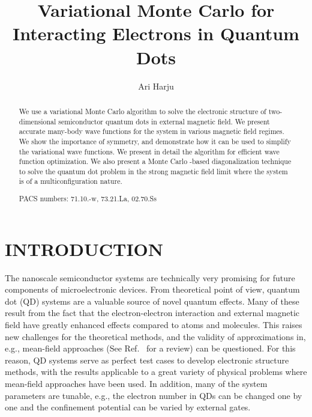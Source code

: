 \documentclass{article}
\title{Variational Monte Carlo for Interacting Electrons in Quantum Dots}
\author{Ari Harju}
\begin{document}
\maketitle

\begin{abstract}
  
  We use a variational Monte Carlo algorithm to solve the electronic
  structure of two-dimensional semiconductor quantum dots in external
  magnetic field. We present accurate many-body wave functions for the
  system in various magnetic field regimes. We show the importance of
  symmetry, and demonstrate how it can be used to simplify the
  variational wave functions. We present in detail the algorithm for
  efficient wave function optimization. We also present a Monte Carlo
  -based diagonalization technique to solve the quantum dot problem in
  the strong magnetic field limit where the system is of a
  multiconfiguration nature.

PACS numbers: 71.10.-w, 73.21.La, 02.70.Ss
\end{abstract}


\section{INTRODUCTION}

The nanoscale semiconductor systems are technically very promising for
future components of microelectronic devices.  From theoretical point
of view, quantum dot (QD) systems are a valuable source of novel
quantum effects. Many of these result from the fact that the
electron-electron interaction and external magnetic field have greatly
enhanced effects compared to atoms and molecules.  This raises new
challenges for the theoretical methods, and the validity of
approximations in, e.g., mean-field approaches (See
Ref.~ for a review) can be questioned. For this reason,
QD systems serve as perfect test cases to develop electronic structure
methods, with the results applicable to a great variety of physical
problems where mean-field approaches have been used. In addition, many
of the system parameters are tunable, e.g., the electron number in QDs
can be changed one by one and the confinement potential can be varied
by external gates.
\end{document}
